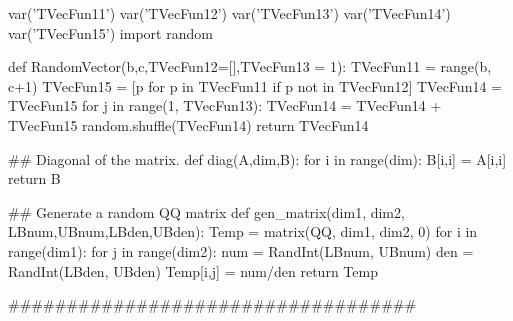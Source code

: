 \begin{sagesilent}
var('TVecFun11')
var('TVecFun12')
var('TVecFun13')
var('TVecFun14')
var('TVecFun15')
import random

def RandomVector(b,c,TVecFun12=[],TVecFun13 = 1):
   TVecFun11 = range(b, c+1)
   TVecFun15 = [p for p in TVecFun11 if p not in TVecFun12]
   TVecFun14 = TVecFun15
   for j in range(1, TVecFun13):
      TVecFun14 = TVecFun14 + TVecFun15
   random.shuffle(TVecFun14)
   return TVecFun14

## Diagonal of the matrix.
def diag(A,dim,B):
   for i in range(dim):
      B[i,i] = A[i,i]
   return B
   
   
## Generate a random QQ matrix
def gen_matrix(dim1, dim2, LBnum,UBnum,LBden,UBden):
   Temp = matrix(QQ, dim1, dim2, 0)
   for i in range(dim1):
      for j in range(dim2):
         num = RandInt(LBnum, UBnum)
         den = RandInt(LBden, UBden)
         Temp[i,j] = num/den
   return Temp
   
   
###################################

\end{sagesilent}

